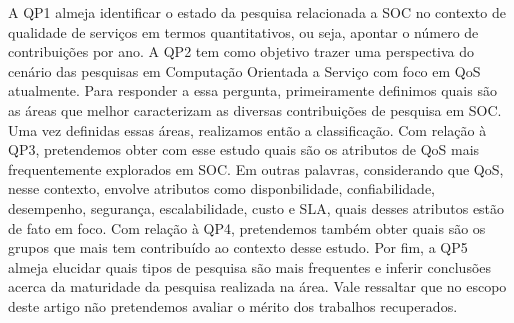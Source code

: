 A QP1 almeja identificar o estado da pesquisa relacionada a SOC no contexto de qualidade de servi\c{c}os em termos quantitativos, ou seja, apontar o n\'{u}mero de contribui\c{c}\~{o}es por ano. A QP2 tem como objetivo trazer uma perspectiva do cen\'{a}rio das pesquisas em Computa\c{c}\~{a}o Orientada a Servi\c{c}o com foco em QoS atualmente. Para responder a essa pergunta, primeiramente definimos quais s\~{a}o as \'{a}reas que melhor caracterizam as diversas contribui\c{c}\~{o}es de pesquisa em SOC. Uma vez definidas essas \'{a}reas, realizamos ent\~{a}o a classifica\c{c}\~{a}o. Com rela\c{c}\~{a}o \`{a} QP3, pretendemos obter com esse estudo quais s\~{a}o os atributos de QoS mais frequentemente explorados em SOC. Em outras palavras, considerando que QoS, nesse contexto, envolve atributos como disponbilidade, confiabilidade, desempenho, seguran\c{c}a, escalabilidade, custo e SLA, quais desses atributos est\~{a}o de fato em foco. Com rela\c{c}\~{a}o \`{a} QP4, pretendemos tamb\'{e}m obter quais s\~{a}o os grupos que mais tem contribu\'{i}do ao contexto desse estudo. Por fim, a QP5 almeja elucidar quais tipos de pesquisa s\~{a}o mais frequentes e inferir conclusões acerca da maturidade da pesquisa realizada na \'{a}rea. Vale ressaltar que no escopo deste artigo n\~{a}o pretendemos avaliar o m\'{e}rito dos trabalhos recuperados.


